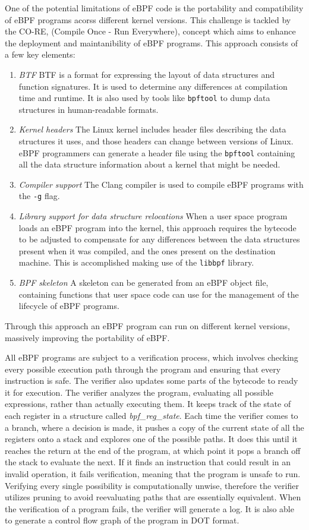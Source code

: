 One of the potential limitations of eBPF code is the portability and compatibility of eBPF programs acorss different kernel versions. This challenge is tackled by the CO-RE, (Compile Once - Run Everywhere), concept which aims to enhance the deployment and maintanibility of eBPF programs. This approach consists of a few key elements:
\begin{enumerate}
    \item \textit{BTF} BTF is a format for expressing the layout of data structures and function signatures. It is used to determine any differences at compilation time and runtime. It is also used by tools like \texttt{bpftool} to dump data structures in human-readable formats. 
    \item \textit{Kernel headers} The Linux kernel includes header files describing the data structures it uses, and those headers can change between versions of Linux. eBPF programmers can generate a header file using the \texttt{bpftool} containing all the data structure information about a kernel that might be needed. 
    \item \textit{Compiler support} The Clang compiler is used to compile eBPF programs with the \texttt{-g} flag. 
    \item \textit{Library support for data structure relocations} When a user space program loads an eBPF program into the kernel, this approach requires the bytecode to be adjusted to compensate for any differences between the data structures present when it was compiled, and the ones present on the destination machine. This is accomplished making use of the \texttt{libbpf} library. 
    \item \textit{BPF skeleton} A skeleton can be generated from an eBPF object file, containing functions that user space code can use for the management of the lifecycle of eBPF programs. 
\end{enumerate}
Through this approach an eBPF program can run on different kernel versions, massively improving the portability of eBPF. 

All eBPF programs are subject to a verification process, which involves checking every possible execution path through the program and ensuring that every instruction is safe. The verifier also updates some parts of the bytecode to ready it for execution.
The verifier analyzes the program, evaluating all possible expressions, rather than actually executing them. It keeps track of the state of each register in a structure called \textit{bpf\_reg\_state}. Each time the verifier comes to a branch, where a decision is made, it pushes a copy of the current state of all the registers onto a stack and explores one of the possible paths. It does this until it reaches the return at the end of the program, at which point it pops a branch off the stack to evaluate the next. If it finds an instruction that could result in an invalid operation, it fails verification, meaning that the program is unsafe to run. 
Verifying every single possibility is computationally unwise, therefore the verifier utilizes pruning to avoid reevaluating paths that are essentially equivalent. 
When the verification of a program fails, the verifier will generate a log. It is also able to generate a control flow graph of the program in DOT format.

